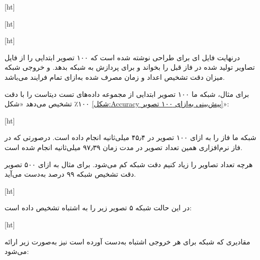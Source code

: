 [ht]


[ht]


[ht]





درنهایت فایل  ای برای طراحی نوشته شده است که ۱۰۰ تصویر ابتدایی را از فایل تصاویر تولید شده در فاز قبل را بخواند و برای پردازش به شبکه بدهد. و خروجی شبکه میزان دقت تشخیص اعداد و زمان مصرف شده به‌ازای تمام فرایند می‌باشد.


برای مثال، شبکه ما ۱۰۰ تصویر ابتدایی از مجموعه داده‌های تست دیتاست  را با دقت ۱۰۰٪ تشخیص می‌دهد «شکل \ref{شکل:Accuracy پیش‌بینی به‌ازای ۱۰۰ تصویر}»:



[ht]






شبکه ما فاز  را به ازای ۱۰۰ تصویر در ۴۵٫۴ میلی‌ثانیه انجام داده است. درصورتی که در فاز نرم‌افزاری همین تعداد تصویر در مدت زمان ۹۷٫۳۹ میلی‌ثانیه انجام شده است. \newpage


هرچه تعداد تصاویر را زیاد کنیم دقت شبکه کم می‌شود. برای مثال به ازای ۵۰۰ تصویر دقت تشخیص شبکه ۹۹ درصد به‌دست می‌آید.

[ht]
\newpage




در این حالت شبکه ۵ تصویر زیر را به اشتباه تشخیص داده است:

[ht]




مقادیری که شبکه برای هر خروجی اشتباه به‌دست آورده است نیز به‌صورت زیر ارائه می‌شود: \newpage


